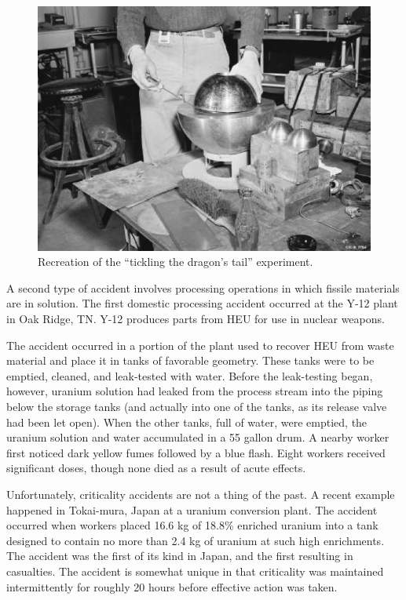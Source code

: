\begin{figure}[ht] 
    \centering
    \includegraphics[keepaspectratio, width = 4.0 in]{images/pu_sphere_2}
    \caption{Recreation of the ``tickling the dragon's tail'' 
             experiment.}
    \label{fig:pu_sphere_2}
\end{figure}


A second type of accident involves processing operations in which
fissile materials are in solution.  The first domestic processing
accident occurred at the Y-12 plant in Oak Ridge, TN.  Y-12 
produces parts from HEU for use in nuclear weapons.  

The accident occurred in a portion of the plant used to 
recover HEU from waste material and place it in tanks of favorable
geometry.  These tanks were to be emptied, cleaned, and leak-tested 
with water.  Before the leak-testing began, however, uranium 
solution had leaked from the process stream into the piping
below the storage tanks (and actually into one of the tanks,
as its release valve had been let open).  When the other tanks, full
of water, were emptied, the uranium solution and water accumulated
in a 55 gallon drum.  A nearby worker first noticed dark yellow
fumes followed by a blue flash.  Eight workers received significant
doses, though none died as a result of acute effects.

Unfortunately, criticality accidents are not a thing of the past.  A 
recent example happened in Tokai-mura, Japan at a uranium conversion
plant.  The accident occurred when workers placed 16.6 kg of 18.8\%
enriched uranium into a tank designed to contain no more than
2.4 kg of uranium at such high enrichments.  The accident was the 
first of its kind in Japan, and the first resulting in casualties.
The accident is somewhat unique in that criticality was maintained
intermittently for roughly 20 hours before effective action was
taken.  

